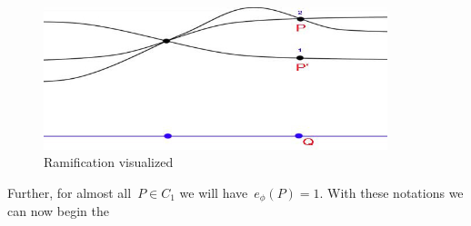 \begin{figure}[ht]
  \centering
  \includegraphics[width=10cm]{0-geometry/ramification}
  \caption{Ramification visualized}
  \label{figure:ramification-visualized}
\end{figure}

Further, for almost all~$P \in C_1$ we will have~$e_{\phi}(P)=1$. With these notations we can now begin the

